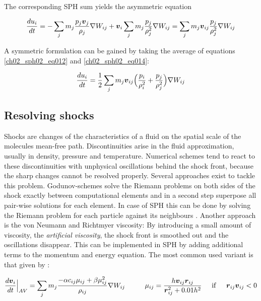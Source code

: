 The corresponding SPH sum yields the asymmetric equation

\begin{equation}
\label{ch02_sph02_eq014}
\frac{du_i}{dt} = - \sum_{j} m_{j} \frac{p_j \boldsymbol{v}_j}{\rho_j} \nabla W_{ij} + \boldsymbol{v}_i \sum_{j} m_{j} \frac{p_j}{\rho_j^2}  \nabla W_{ij} = \sum_{j} m_j \boldsymbol{v}_{ij} \frac{p_j}{\rho_j^2}  \nabla W_{ij}
\end{equation}

A symmetric formulation can be gained by taking the average of equations \ref{ch02_sph02_eq012} and \ref{ch02_sph02_eq014}:

\begin{equation}
\label{ch02_sph02_eq015}
\frac{du_i}{dt} = \frac{1}{2} \sum_{j} m_{j} \boldsymbol{v}_{ij} \Big( \frac{p_i}{\rho_i^2}  + \frac{p_j}{\rho_j^2} \Big) \nabla W_{ij}
\end{equation}

\subsection{Resolving shocks}
Shocks are changes of the characteristics of a fluid on the spatial scale of the molecules mean-free path. Discontinuities arise in the fluid approximation, usually in density, pressure and temperature.
Numerical schemes tend to react to these discontinuities with unphysical oscillations behind the shock front, because the sharp changes cannot be resolved properly.
Several approaches exist to tackle this problem. Godunov-schemes solve the Riemann problems on both sides of the shock exactly between computational elements and in a second step superpose all pair-wise solutions for each element. In case of SPH this can be done by solving the Riemann problem for each particle against its neighbours \citep{Monaghan:1997p3938}.
Another approach is the von Neumann and Richtmyer viscosity: By introducing a small amount of viscosity, the \emph{artificial viscosity}, the shock front is smoothed out and the oscillations disappear. This can be implemented in SPH by adding additional terms to the momentum and energy equation. The most common used variant is that given by \citep{Monaghan:1992ARAA..30..543M}:

\begin{equation}
\label{ch02_sph02_eq016}
\frac{d \boldsymbol{v}_i }{dt} \Big|_{AV} = \sum_{j} m_j \frac{-\alpha c_{ij} \mu_{ij} + \beta \mu_{ij}^2}{\rho_{ij}} \nabla W_{ij} \hspace{1.0cm} \mu_{ij} = \frac{h \boldsymbol{v}_{ij} \boldsymbol{r}_{ij}}{\boldsymbol{r}_{ij}^2 + 0.01h^2}  \hspace{0.5cm} \mathrm{if}  \hspace{0.5cm} \boldsymbol{r}_{ij} \boldsymbol{v}_{ij} < 0
\end{equation}

